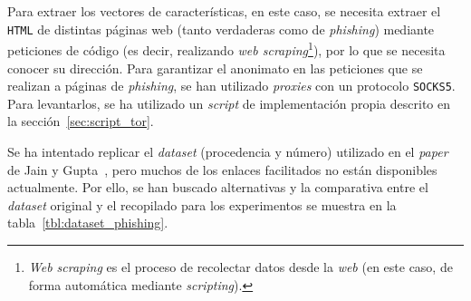 \begin{table}
	\begin{centering}
		\caption[\textit{Phishing}: descripción del \textit{dataset}]{\textit{Dataset} de \textit{phishing}.}
		\label{tbl:dataset_phishing}	
	\end{centering}
\end{table}

Para extraer los vectores de características, en este caso, se necesita extraer el \texttt{HTML} de distintas páginas web (tanto verdaderas como de \textit{phishing}) mediante peticiones de código (es decir, realizando \textit{web scraping}\footnote{\textit{Web scraping} es el proceso de recolectar datos desde la \textit{web} (en este caso, de forma automática mediante \textit{scripting}).}), por lo que se necesita conocer su dirección. Para garantizar el anonimato en las peticiones que se realizan a páginas de \textit{phishing}, se han utilizado \textit{proxies} con un protocolo \texttt{SOCKS5}. Para levantarlos, se ha utilizado un \textit{script} de implementación propia descrito en la sección~\ref{sec:script_tor}.

Se ha intentado replicar el \textit{dataset} (procedencia y número) utilizado en el \textit{paper} de Jain y Gupta~\cite{featuresPhishing2018Gupta}, pero muchos de los enlaces facilitados no están disponibles actualmente. Por ello, se han buscado alternativas y la comparativa entre el \textit{dataset} original y el recopilado para los experimentos se muestra en la tabla~\ref{tbl:dataset_phishing}.

